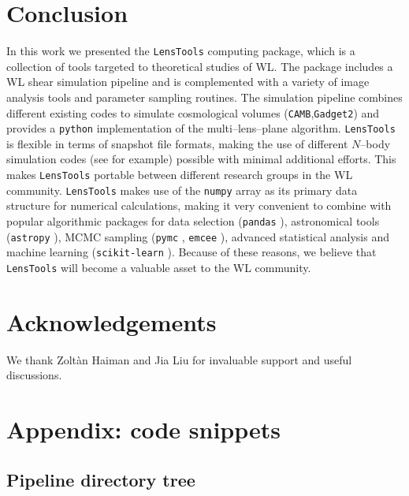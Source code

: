 \documentclass[reprint,aps,prd,superscriptaddress,showkeys,showpacs]{revtex4-1}
\newcommand{\ttt}[1]{\texttt{#1}}
\newcommand{\LT}{\texttt{LensTools} }
\begin{document}
\section{Conclusion}
%
In this work we presented the \LT computing package, which is a collection of tools targeted to theoretical studies of WL. The package includes a WL shear simulation pipeline and is complemented with a variety of image analysis tools and parameter sampling routines. The simulation pipeline combines different existing codes to simulate cosmological volumes (\ttt{CAMB},\ttt{Gadget2}) and provides a \ttt{python} implementation of the multi--lens--plane algorithm. \LT is flexible in terms of snapshot file formats, making the use of different $N$--body simulation codes (see \citep{HACC} for example) possible with minimal additional efforts. This makes \LT portable between different research groups in the WL community. \LT makes use of the \ttt{numpy} array as its primary data structure for numerical calculations, making it very convenient to combine with popular algorithmic packages for data selection (\ttt{pandas} \citep{pandas}), astronomical tools (\ttt{astropy} \citep{astropy}), MCMC sampling (\ttt{pymc} \citep{pymc}, \ttt{emcee} \citep{emcee}), advanced statistical analysis and machine learning (\ttt{scikit-learn} \citep{scikit-learn}). Because of these reasons, we believe that \LT will become a valuable asset to the WL community.    


 

\section*{Acknowledgements}
We thank Zolt\`an Haiman and Jia Liu for invaluable support and useful discussions. 




\section*{Appendix: code snippets}

\subsection{Pipeline directory tree}
\end{document}
